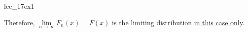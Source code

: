 \begin{Example}{}{lec_17ex1}
\begin{enumerate}[label=(\roman*)]
              Therefore,
              $ \lim\limits_{{n} \to {\infty}} F_n(x) =F(x) $
              is the limiting distribution
              \underline{in this case only}.
    \end{enumerate}
\end{Example}
